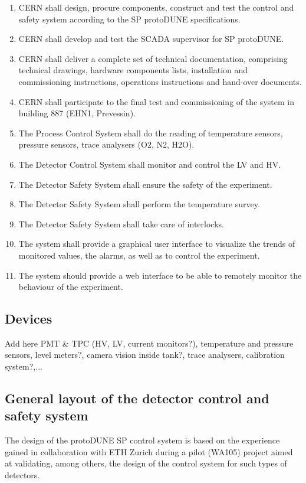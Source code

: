 \begin{enumerate}
\item	CERN shall design, procure components, construct and test the control and safety system according to the SP protoDUNE specifications.
\item	CERN shall develop and test the SCADA supervisor for SP protoDUNE.
\item	CERN shall deliver a complete set of technical documentation, comprising technical drawings, hardware components lists, installation and commissioning instructions, operations instructions and hand-over documents.
\item	CERN shall participate to the final test and commissioning of the system in building 887 (EHN1, Prevessin).
\item	The Process Control System shall do the reading of temperature sensors, pressure sensors, trace analysers (O2, N2, H2O).
\item	The Detector Control System shall monitor and control the LV and HV.
\item	The Detector Safety System shall ensure the safety of the experiment.
\item	The Detector Safety System shall perform the temperature survey.
\item	The Detector Safety System shall take care of interlocks.
\item	The system shall provide a graphical user interface to visualize the trends of monitored values, the alarms, as well as to control the experiment.
\item	The system should provide a web interface to be able to remotely monitor the behaviour of the experiment.
\end{enumerate}
\subsection{Devices}
Add here PMT \& TPC (HV, LV, current monitors?), temperature and pressure sensors, level meters?, camera vision inside tank?, trace analysers, 
calibration system?,... 

\subsection{General layout of the detector control and safety system}
The design of the protoDUNE SP control system is based on the experience gained in collaboration with ETH Zurich during a pilot (WA105) project 
aimed at validating, among others, the design of the control system for such types of detectors. 

